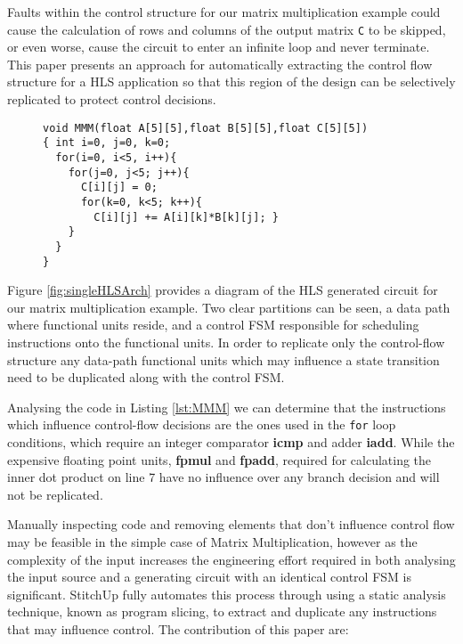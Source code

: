 Faults within the control structure for our matrix multiplication example
could cause the calculation of rows and columns of the output matrix \lstinline$C$ to be skipped,
or even worse, cause the circuit to enter an infinite loop and never terminate.
This paper presents an approach for automatically extracting the control flow structure
for a HLS application so that this region of the design can be selectively
replicated to protect control decisions.



\begin{figure}[t]
\begin{lstlisting}[label={lst:MMM}, captionpos=b, caption={Matrix Multiplication Example}]
void MMM(float A[5][5],float B[5][5],float C[5][5])
{ int i=0, j=0, k=0;
  for(i=0, i<5, i++){
    for(j=0, j<5; j++){
      C[i][j] = 0;
      for(k=0, k<5; k++){
        C[i][j] += A[i][k]*B[k][j]; }
    }
  }
}
\end{lstlisting}
\vspace{-7mm}
\end{figure}

Figure \ref{fig:singleHLSArch} provides a diagram of the HLS generated
circuit for our matrix multiplication example.
Two clear partitions can be seen, a data path where functional units reside, and a
control FSM responsible for scheduling instructions onto the functional units.
In order to replicate only the control-flow structure
any data-path functional units which may influence a state transition need to be
duplicated along with the control FSM.

Analysing the code in Listing \ref{lst:MMM} we can determine that the instructions
which influence control-flow decisions are the ones used in the \lstinline{for} loop
conditions, which require an integer comparator \textbf{icmp} and adder \textbf{iadd}.
While the expensive floating point units, \textbf{fpmul} and \textbf{fpadd}, required
for calculating the inner dot product on line 7 have no
influence over any branch decision and will not be replicated.

Manually inspecting code and removing elements that don't influence control flow
may be feasible in the simple case of Matrix Multiplication, however as the complexity of the input increases
the engineering effort required in both analysing the input source and a generating circuit with an identical control FSM is
significant.
StitchUp fully automates this process through using a static analysis technique, known as program slicing, to extract
and duplicate any instructions that may influence control. The contribution of this paper are:

